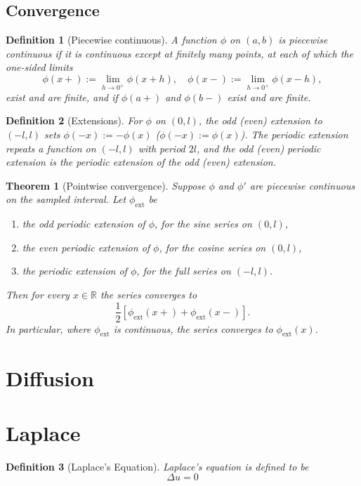 \documentclass{article}
\newtheorem{theorem}{Theorem}
\newtheorem{definition}{Definition}
\newcommand{\R}{\mathbb{R}}
\begin{document}
\subsection{Convergence}
\begin{definition}[Piecewise continuous]
    A function $\phi$ on $(a,b)$ is piecewise continuous if it is continuous except at finitely many points, at each of which the one-sided limits
    \[\phi(x+) := \lim_{h\to0^+}\phi(x+h),\quad \phi(x-):=\lim_{h\to0^+}\phi(x-h),\]
    exist and are finite, and if $\phi(a+)$ and $\phi(b-)$ exist and are finite.
\end{definition}
\begin{definition}[Extensions]
    For $\phi$ on $(0,l)$, the odd (even) extension to $(-l,l)$ sets $\phi(-x) := -\phi(x)$ ($\phi(-x) := \phi(x)$). The periodic extension repeats a function on $(-l,l)$ with period $2l$, and the odd (even) periodic extension is the periodic extension of the odd (even) extension.
\end{definition}
\begin{theorem}[Pointwise convergence]
    Suppose $\phi$ and $\phi'$ are piecewise continuous on the sampled interval. Let $\phi_{\text{ext}}$ be
    \begin{enumerate}
        \item the odd periodic extension of $\phi$, for the sine series on $(0,l)$,
        \item the even periodic extension of $\phi$, for the cosine series on $(0,l)$,
        \item the periodic extension of $\phi$, for the full series on $(-l,l)$.
    \end{enumerate}
    Then for every $x\in\R$ the series converges to
    \[\frac{1}{2}[\phi_{\text{ext}}(x+)+\phi_{\text{ext}}(x-)].\]
    In particular, where $\phi_{\text{ext}}$ is continuous, the series converges to $\phi_{\text{ext}}(x)$.
\end{theorem}

\section{Diffusion}


\section{Laplace}
\begin{definition}[Laplace's Equation]
    Laplace's equation is defined to be
    \begin{equation}
        \label{eq:laplace}
        \Delta u =0
    \end{equation}
\end{definition}
\end{document}
